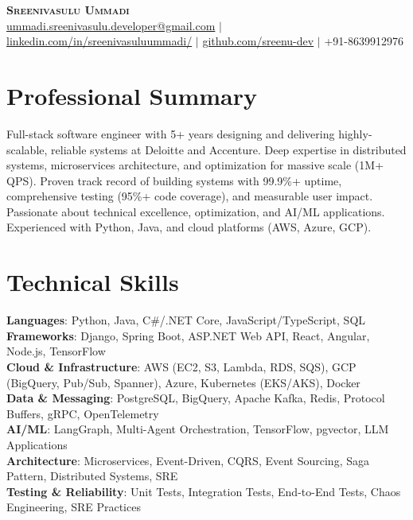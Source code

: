\documentclass[letterpaper,11pt]{article}
\begin{document}
\begin{center}
    \textbf{\Huge \scshape Sreenivasulu Ummadi} \\ \vspace{5pt}
    \small \href{mailto:ummadi.sreenivasulu.developer@gmail.com}{ummadi.sreenivasulu.developer@gmail.com} $|$
    \href{https://www.linkedin.com/in/sreenivasuluummadi/}{linkedin.com/in/sreenivasuluummadi/} $|$
    \href{https://github.com/sreenu-dev}{github.com/sreenu-dev} $|$
    \small +91-8639912976
\end{center}

\section{Professional Summary}
\small{Full-stack software engineer with 5+ years designing and delivering highly-scalable, reliable systems at Deloitte and Accenture. Deep expertise in distributed systems, microservices architecture, and optimization for massive scale (1M+ QPS). Proven track record of building systems with 99.9\%+ uptime, comprehensive testing (95\%+ code coverage), and measurable user impact. Passionate about technical excellence, optimization, and AI/ML applications. Experienced with Python, Java, and cloud platforms (AWS, Azure, GCP).}

\section{Technical Skills}
 \begin{itemize}[leftmargin=0.15in, label={}]
    \small{\item{
     \textbf{Languages}{: Python, Java, C\#/.NET Core, JavaScript/TypeScript, SQL} \\
     \textbf{Frameworks}{: Django, Spring Boot, ASP.NET Web API, React, Angular, Node.js, TensorFlow} \\
     \textbf{Cloud \& Infrastructure}{: AWS (EC2, S3, Lambda, RDS, SQS), GCP (BigQuery, Pub/Sub, Spanner), Azure, Kubernetes (EKS/AKS), Docker} \\
     \textbf{Data \& Messaging}{: PostgreSQL, BigQuery, Apache Kafka, Redis, Protocol Buffers, gRPC, OpenTelemetry} \\
     \textbf{AI/ML}{: LangGraph, Multi-Agent Orchestration, TensorFlow, pgvector, LLM Applications} \\
     \textbf{Architecture}{: Microservices, Event-Driven, CQRS, Event Sourcing, Saga Pattern, Distributed Systems, SRE} \\
     \textbf{Testing \& Reliability}{: Unit Tests, Integration Tests, End-to-End Tests, Chaos Engineering, SRE Practices}
    }}
 \end{itemize}
\end{document}
